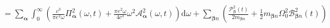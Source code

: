 \documentclass{article}
\begin{document}
\begin{equation}
\begin{split}
&= \sum_{\bm{\alpha}}\int_0^\infty\left(\frac{c^3}{\pi e^2\omega}\mathit{\Pi}_{\bm{\alpha}}^2(\omega,t) + \frac{\pi e^2\omega}{4c^3}\omega^2\mathcal{A}_{\bm{\alpha}}^2(\omega,t)\right)\mathrm{d}\omega + \sum_{\bm{\beta}n}\left(\frac{\mathcal{P}_{\bm{\beta}}^2(t)}{2m_{\bm{\beta}n}} + \frac{1}{2}m_{\bm{\beta}n}\Omega_0^2\mathcal{B}_{\bm{\beta}n}^2(t)\right)\\

\end{split}
\end{equation}
\end{document}
